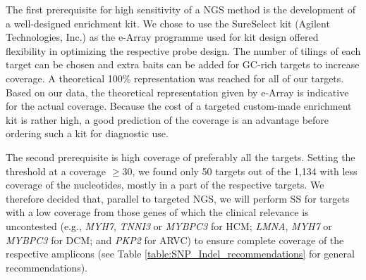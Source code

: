 The first prerequisite for high sensitivity of a NGS method is the development of a well-designed enrichment kit. 
We chose to use the SureSelect kit (Agilent Technologies, Inc.) as the e-Array programme used for kit design offered flexibility in optimizing the respective probe design. 
The number of tilings of each target can be chosen and extra baits can be added for GC-rich targets to increase coverage. 
A theoretical 100\% representation was reached for all of our targets. 
Based on our data, the theoretical representation given by e-Array is indicative for the actual coverage. 
Because the cost of a targeted custom-made enrichment kit is rather high, a good prediction of the coverage is an advantage before ordering such a kit for diagnostic use. 

The second prerequisite is high coverage of preferably all the targets. 
Setting the threshold at a coverage $\ge$30, we found only 50 targets out of the 1,134 with less coverage of the nucleotides, mostly in a part of the respective targets. 
We therefore decided that, parallel to targeted NGS, we will perform SS for targets with a low coverage from those genes of which the clinical relevance is uncontested (e.g., \textsl{MYH7}, \textsl{TNNI3} or \textsl{MYBPC3} for HCM; \textsl{LMNA}, \textsl{MYH7} or \textsl{MYBPC3} for DCM; and \textsl{PKP2} for ARVC) to ensure complete coverage of the respective amplicons (see Table \ref{table:SNP_Indel_recommendations} for general recommendations). 

